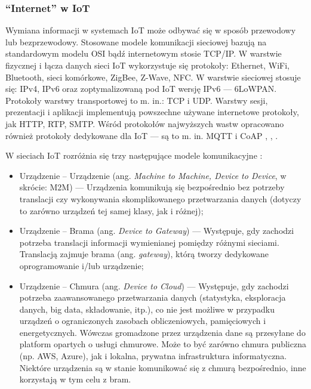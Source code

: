 \documentclass[a4paper, 12pt, twoside]{article}
\begin{document}
\subsubsection{``Internet'' w IoT}

Wymiana informacji w systemach IoT może odbywać się w sposób przewodowy lub bezprzewodowy.
Stosowane modele komunikacji sieciowej bazują na standardowym modelu OSI bądź
internetowym stosie TCP/IP. W warstwie fizycznej i łącza danych
sieci IoT wykorzystuje się protokoły: Ethernet, WiFi, Bluetooth, sieci komórkowe,
ZigBee, Z-Wave, NFC. W warstwie sieciowej stosuje się: IPv4, IPv6 oraz zoptymalizowaną
pod IoT wersję IPv6 --- 6LoWPAN. Protokoły warstwy transportowej to m. in.: TCP i UDP. 
Warstwy sesji, prezentacji i aplikacji implementują powszechne używane internetowe protokoły, jak
HTTP, RTP, SMTP. Wśród protokołów najwyższych wastw opracowano również 
protokoły dedykowane dla IoT --- są to m. in. MQTT i CoAP \cite{internet-reczy}, \cite{intro-to-iot}, \cite{iot-hype-to-reality}.


W sieciach IoT rozróżnia się trzy następujące modele komunikacyjne \cite{intro-to-iot}:

\begin{itemize}
    \itemsep0em 
    \item Urządzenie -- Urządzenie (ang. \emph{Machine to Machine, Device to Device}, w skrócie: M2M)
    --- Urządzenia komunikują się bezpośrednio bez potrzeby translacji czy wykonywania 
    skomplikowanego przetwarzania danych (dotyczy to zarówno urządzeń tej samej klasy, jak i różnej);
    \item Urządzenie -- Brama (ang. \emph{Device to Gateway})
    --- Występuje, gdy zachodzi potrzeba translacji informacji wymienianej pomiędzy różnymi sieciami.
    Translacją zajmuje brama (ang. \emph{gateway}), którą tworzy dedykowane oprogramowanie i/lub urządzenie;
    \item Urządzenie -- Chmura (ang. \emph{Device to Cloud})
    --- Występuje, gdy zachodzi potrzeba zaawansowanego przetwarzania danych 
    (statystyka, eksploracja danych, big data, składowanie, itp.), 
    co nie jest możliwe w przypadku urządzeń o ograniczonych zasobach obliczeniowych, 
    pamięciowych i energetycznych. Wówczas gromadzone przez urządzenia dane są 
    przesyłane do platform opartych o usługi chmurowe. Może to być zarówno chmura publiczna 
    (np. AWS, Azure), jak i lokalna, prywatna infrastruktura informatyczna. 
    Niektóre urządzenia są w stanie komunikować się z chmurą bezpośrednio, inne
    korzystają w tym celu z bram.
\end{itemize}
\end{document}
